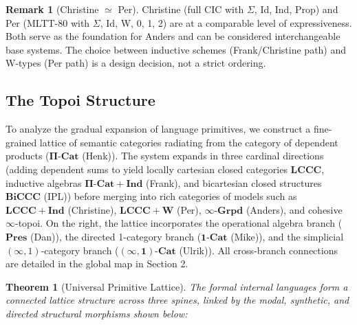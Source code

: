 \documentclass{article}
\theoremstyle{definition}
\newtheorem{remark}[definition]{Remark}
\theoremstyle{plain}
\newtheorem{theorem}[definition]{Theorem}
\begin{document}
\begin{remark}[Christine $\simeq$ Per]
Christine (full CIC with $\Sigma$, Id, Ind, Prop) and Per (MLTT-80 with
$\Sigma$, Id, W, 0, 1, 2) are at a comparable level of expressiveness. Both
serve as the foundation for Anders and can be considered interchangeable
base systems. The choice between inductive schemes (Frank/Christine path) and
W-types (Per path) is a design decision, not a strict ordering.
\end{remark}

\newpage
\subsection{The Topoi Structure}
To analyze the gradual expansion of language primitives, we construct a fine-grained lattice of semantic categories radiating from the category of dependent products ($\mathbf{\Pi}\text{-}\mathbf{Cat}$ (Henk)). The system expands in three cardinal directions (adding dependent sums to yield locally cartesian closed categories $\mathbf{LCCC}$, inductive algebras $\mathbf{\Pi}\text{-}\mathbf{Cat} + \mathbf{Ind}$ (Frank), and bicartesian closed structures $\mathbf{BiCCC}$ (IPL)) before merging into rich categories of models such as $\mathbf{LCCC} + \mathbf{Ind}$ (Christine), $\mathbf{LCCC} + \mathbf{W}$ (Per), $\infty\text{-}\mathbf{Grpd}$ (Anders), and cohesive $\infty$-topoi. On the right, the lattice incorporates the operational algebra branch ($\mathbf{Pres}$ (Dan)), the directed 1-category branch ($\mathbf{1\text{-}Cat}$ (Mike)), and the simplicial $(\infty, 1)$-category branch ($\mathbf{(\infty, 1)\text{-}Cat}$ (Ulrik)). All cross-branch connections are detailed in the global map in Section 2.

\begin{theorem}[Universal Primitive Lattice]
The formal internal languages form a connected lattice structure across three spines, linked by the modal, synthetic, and directed structural morphisms shown below:
\end{theorem}
\end{document}
